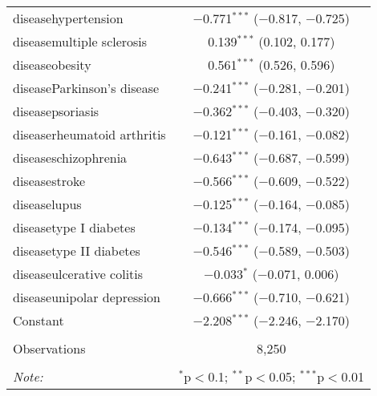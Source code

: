 \begin{table}[!htbp]
\begin{tabular}{@{\extracolsep{5pt}}lc}
  diseasehypertension & $-$0.771$^{***}$ ($-$0.817, $-$0.725) \\ 
  diseasemultiple sclerosis & 0.139$^{***}$ (0.102, 0.177) \\ 
  diseaseobesity & 0.561$^{***}$ (0.526, 0.596) \\ 
  diseaseParkinson's disease & $-$0.241$^{***}$ ($-$0.281, $-$0.201) \\ 
  diseasepsoriasis & $-$0.362$^{***}$ ($-$0.403, $-$0.320) \\ 
  diseaserheumatoid arthritis & $-$0.121$^{***}$ ($-$0.161, $-$0.082) \\ 
  diseaseschizophrenia & $-$0.643$^{***}$ ($-$0.687, $-$0.599) \\ 
  diseasestroke & $-$0.566$^{***}$ ($-$0.609, $-$0.522) \\ 
  diseaselupus & $-$0.125$^{***}$ ($-$0.164, $-$0.085) \\ 
  diseasetype I diabetes & $-$0.134$^{***}$ ($-$0.174, $-$0.095) \\ 
  diseasetype II diabetes & $-$0.546$^{***}$ ($-$0.589, $-$0.503) \\ 
  diseaseulcerative colitis & $-$0.033$^{*}$ ($-$0.071, 0.006) \\ 
  diseaseunipolar depression & $-$0.666$^{***}$ ($-$0.710, $-$0.621) \\ 
  Constant & $-$2.208$^{***}$ ($-$2.246, $-$2.170) \\ 
 \hline \\[-1.8ex] 
Observations & 8,250 \\ 
\hline 
\hline \\[-1.8ex] 
\textit{Note:}  & \multicolumn{1}{r}{$^{*}$p$<$0.1; $^{**}$p$<$0.05; $^{***}$p$<$0.01} \\ 
\end{tabular} 
\end{table} 
